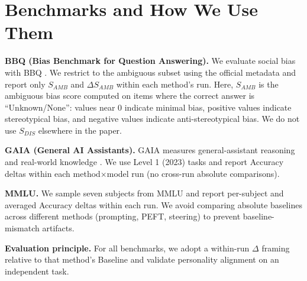\section{Benchmarks and How We Use Them}
\label{app:benchmarks}

\noindent\textbf{BBQ (Bias Benchmark for Question Answering).} We evaluate social bias with BBQ \citep{parrish-etal-2022-bbq}. We restrict to the ambiguous subset using the official metadata and report only $S_{AMB}$ and $\Delta S_{AMB}$ within each method's run. Here, $S_{AMB}$ is the ambiguous bias score computed on items where the correct answer is ``Unknown/None'': values near 0 indicate minimal bias, positive values indicate stereotypical bias, and negative values indicate anti-stereotypical bias. We do not use $S_{DIS}$ elsewhere in the paper.

\noindent\textbf{GAIA (General AI Assistants).} GAIA measures general-assistant reasoning and real-world knowledge \citep{mialon-etal-2023-gaia}. We use Level 1 (2023) tasks and report Accuracy deltas within each method$\times$model run (no cross-run absolute comparisons).

\noindent\textbf{MMLU.} We sample seven subjects from MMLU \citep{hendrycks-etal-2021-mmlu} and report per-subject and averaged Accuracy deltas within each run. We avoid comparing absolute baselines across different methods (prompting, PEFT, steering) to prevent baseline-mismatch artifacts.

\noindent\textbf{Evaluation principle.} For all benchmarks, we adopt a within-run $\Delta$ framing relative to that method's Baseline and validate personality alignment on an independent task.

